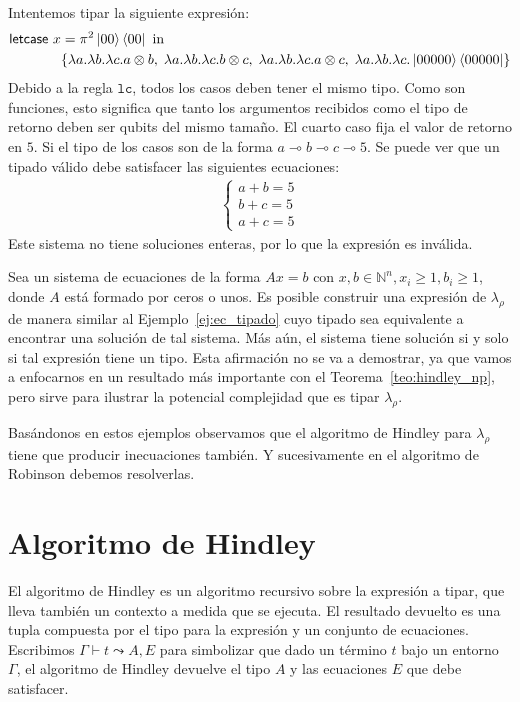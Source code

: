 \begin{ejemplo}\label{ej:ec_tipado}
    Intentemos tipar la siguiente expresión:
    \begin{align*}
        \textsf{letcase }x &= \pi^2 \ket{00}\bra{00} \textrm{ in } \\
        &\{\lambda a.\lambda b.\lambda c.a\otimes b,\;\lambda a.\lambda b.\lambda c.b\otimes c,\;\lambda a.\lambda b.\lambda c.a\otimes c, \;\lambda a.\lambda b.\lambda c.\ket{00000}\bra{00000}\}
    \end{align*}
     Debido a la regla $\mathtt{lc}$, todos los casos deben tener el mismo tipo. Como son funciones, esto significa que tanto los argumentos recibidos como el tipo de retorno deben ser qubits del mismo tamaño. El cuarto caso fija el valor de retorno en $5$. Si el tipo de los casos son de la forma $a\multimap b \multimap c \multimap 5$. Se puede ver que un tipado válido debe satisfacer las siguientes ecuaciones:
    \begin{align*}
        \begin{cases}
            a+b=5\\
            b+c=5\\
            a+c=5
        \end{cases}
    \end{align*}
    Este sistema no tiene soluciones enteras, por lo que la expresión es inválida.
\end{ejemplo}
\begin{observacion}
    Sea un sistema de ecuaciones de la forma $Ax=b$ con $x,b\in \mathbb{N}^n, x_i\geq 1, b_i\geq 1$, donde $A$ está formado por ceros o unos. Es posible construir una expresión de $\lambda_\rho$ de manera similar al Ejemplo~\ref{ej:ec_tipado} cuyo tipado sea equivalente a encontrar una solución de tal sistema. Más aún, el sistema tiene solución si y solo si tal expresión tiene un tipo. Esta afirmación no se va a demostrar, ya que vamos a enfocarnos en un resultado más importante con el Teorema~\ref{teo:hindley_np}, pero sirve para ilustrar la potencial complejidad que es tipar $\lambda_\rho$.
\end{observacion}

Basándonos en estos ejemplos observamos que el algoritmo de Hindley para $\lambda_\rho$ tiene que producir inecuaciones también. Y sucesivamente en el algoritmo de Robinson debemos resolverlas.

\section{Algoritmo de Hindley}
El algoritmo de Hindley es un algoritmo recursivo sobre la expresión a tipar, que lleva también un contexto a medida que se ejecuta. El resultado devuelto es una tupla compuesta por el tipo para la expresión y un conjunto de ecuaciones. Escribimos $\Gamma \vdash t \leadsto A, E$ para simbolizar que dado un término $t$ bajo un entorno $\Gamma$, el algoritmo de Hindley devuelve el tipo $A$ y las ecuaciones $E$ que debe satisfacer.

